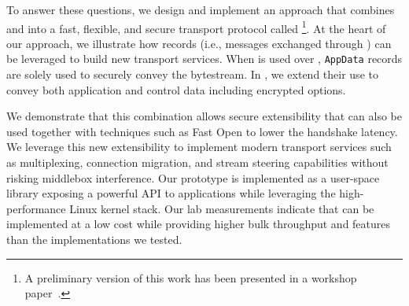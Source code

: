 To answer these questions, we design and implement an approach that combines
\tcp and  into a fast, flexible, and secure transport protocol called 
\textbf{\tcpls}
%
\footnote{A preliminary version of this work has been presented in a workshop
  paper~\cite{rochet2020tcpls}.}.  At the heart of our approach, we illustrate
how \tls records (i.e., messages exchanged through \tls) can be leveraged to
build new transport services. When \tls is used over \tcp, \tls 
\texttt{AppData} records are
solely used to securely convey the \tcp bytestream. In \tcpls, we extend their
use to convey both application and control data including encrypted \tcp
options.

We demonstrate that this combination allows secure extensibility that can also
be used together with techniques such as \tcp Fast Open \cite{rfc7413} to lower 
the handshake latency. We leverage this new extensibility to implement modern 
transport services such as multiplexing, connection migration, and stream 
steering capabilities without risking middlebox interference. Our \tcpls 
prototype is implemented as a user-space library exposing a powerful API to 
applications %
while leveraging the high-performance Linux kernel \tcp stack. Our lab 
measurements indicate that \tcpls can be implemented at a low cost while 
providing higher bulk throughput and features than the \quic implementations we 
tested.


